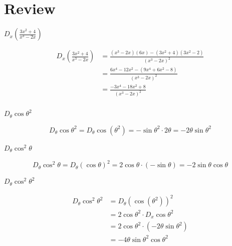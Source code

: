 \documentclass[fleqn]{exam}
\begin{document}
\section{Review}
\begin{questions}

\question $D_x\left( \frac{3x^2 + 4}{x^3 - 2x} \right)$

\begin{solution}
\begin{align*}
  D_x\left( \frac{3x^2 + 4}{x^3 - 2x} \right) &= \frac{(x^3 - 2x)(6x) - (3x^2 + 4)(3x^2 - 2)}{(x^3 - 2x)^2} \\
  &= \frac{6x^4 - 12x^2 - (9x^4 + 6x^2 - 8)}{(x^3 - 2x)^2} \\
  &= \frac{-3x^4 - 18x^2 + 8}{(x^3 - 2x)^2} \\
\end{align*}

\end{solution}

\question $D_{\theta} \cos \theta^2$

\begin{solution}
\[
  D_{\theta} \cos \theta^2 = D_{\theta} \cos \left( \theta^2 \right) 
    = -\sin \theta^2 \cdot 2 \theta = -2 \theta \sin \theta^2
\]
\end{solution}

\question $D_{\theta} \cos^2 \theta$
\begin{solution}
\[
  D_{\theta} \cos^2 \theta = D_{\theta} \left(\cos \theta \right)^2
    = 2 \cos \theta \cdot (- \sin \theta) = -2 \sin \theta \cos \theta
\]
\end{solution}

\ifprintanswers
\pagebreak
\fi

\question $D_{\theta} \cos^2 \theta^2$

\begin{solution}
\begin{align*}
  D_{\theta} \cos^2 \theta^2 &= D_{\theta} \left(\cos (\theta^2) \right)^2 \\
  &= 2 \cos \theta^2 \cdot D_x \cos \theta^2 \\
  &= 2 \cos \theta^2 \cdot (-2 \theta \sin \theta^2) \\
  &= -4 \theta \sin \theta^2 \cos \theta^2 \\  
\end{align*}

\end{solution}



\end{questions}
\end{document}
